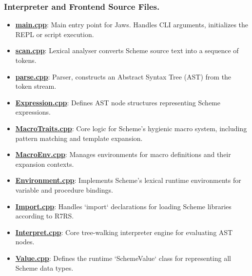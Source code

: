 \documentclass[final]{cmpreport_02}
\begin{document}
\subsubsection*{Interpreter and Frontend Source Files.}
\label{tab:jaws-interpreter-frontend-files}
\begin{itemize}
    \item \textbf{\href{https://github.com/jamie-wales/Jaws/blob/main/src/main.cpp}{main.cpp}}: Main entry point for Jaws. Handles CLI arguments, initializes the REPL or script execution.
    \item \textbf{\href{https://github.com/jamie-wales/Jaws/blob/main/src/frontend/scan.cpp}{scan.cpp}}: Lexical analyser converts Scheme source text into a sequence of tokens.
    \item \textbf{\href{https://github.com/jamie-wales/Jaws/blob/main/src/frontend/parse.cpp}{parse.cpp}}: Parser, constructs an Abstract Syntax Tree (AST) from the token stream.
    \item \textbf{\href{https://github.com/jamie-wales/Jaws/blob/main/src/frontend/Expression.cpp}{Expression.cpp}}: Defines AST node structures representing Scheme expressions.
    \item \textbf{\href{https://github.com/jamie-wales/Jaws/blob/main/src/frontend/MacroTraits.cpp}{MacroTraits.cpp}}: Core logic for Scheme's hygienic macro system, including pattern matching and template expansion.
    \item \textbf{\href{https://github.com/jamie-wales/Jaws/blob/main/src/frontend/MacroEnvironment.cpp}{MacroEnv.cpp}}: Manages environments for macro definitions and their expansion contexts.
    \item \textbf{\href{https://github.com/jamie-wales/Jaws/blob/main/src/frontend/Environment.cpp}{Environment.cpp}}: Implements Scheme's lexical runtime environments for variable and procedure bindings.
    \item \textbf{\href{https://github.com/jamie-wales/Jaws/blob/main/src/interpreter/import.cpp}{Import.cpp}}: Handles `import` declarations for loading Scheme libraries according to R7RS.
    \item \textbf{\href{https://github.com/jamie-wales/Jaws/blob/main/src/interpreter/interpret.cpp}{Interpret.cpp}}: Core tree-walking interpreter engine for evaluating AST nodes.
    \item \textbf{\href{https://github.com/jamie-wales/Jaws/blob/main/src/interpreter/Value.cpp}{Value.cpp}}: Defines the runtime `SchemeValue` class for representing all Scheme data types.

\end{itemize}
\end{document}
